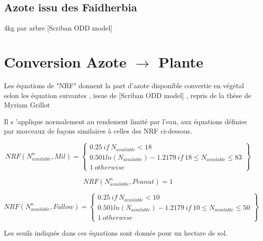 \documentclass[10pt,a4paper,french]{article} %
\begin{document}
\subsection{Azote issu des Faidherbia}


4kg par arbre [Scriban ODD model]





\section{Conversion Azote $\rightarrow$ Plante}



Les équations de "NRF" donnent la part d'azote disponible convertie en végétal selon les équation suivantes , issue de [Scriban ODD model]  , repris de la thèse de Myriam Grillot 


Il s 'applique normalement au rendement limité par l'eau,  aux équations définies par morceaux de façons similaires à celles des NRF  ci-dessous. 

\begin{equation}
  NRF(N_{available}^n,Mil)=\left\{
                \begin{array}{ll}
                  0.25 \ if \ N_{available} < 18\\
                0.501 ln(N_{available})-1.2179 \ if \ 18 \leq N_{available} \leq 83  \\
                  1 \ otherwise
                \end{array}
              \right\} 
 \end{equation} 

\begin{equation}
   NRF(N_{available}^n,Peanut)=1
  \end{equation} 
 

 \begin{equation}
   NRF(N_{available}^n,Fallow)=\left\{
                \begin{array}{ll}
                  0.25 \ if \ N_{available} < 10\\
                0.501 ln(N_{available})-1.2179 \ if \ 10 \leq N_{available} \leq 50  \\
                  1 \ otherwise
                \end{array}
              \right\}
  \end{equation} 
  
  


Les seuils indiqués dans ces équations sont donnés pour un hectare de sol.
\end{document}
